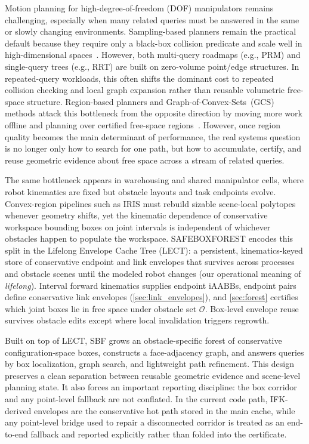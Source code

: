 \documentclass[journal]{IEEEtran}
\DeclareRobustCommand{\textsc}[1]{\textnormal{\MakeUppercase{#1}}}
\newcommand{\iAABB}{\ensuremath{\mathrm{iAABB}}}
\begin{document}
Motion planning for high-degree-of-freedom (DOF) manipulators remains challenging,
especially when many related queries must be answered in the same or slowly
changing environments. Sampling-based planners remain the practical default
because they require only a black-box collision predicate and scale well in
high-dimensional spaces~\cite{lavalle2006planning,lavalle1998rapidly,
kavraki1996probabilistic,karaman2011sampling}. However, both multi-query
roadmaps (e.g., PRM) and single-query trees (e.g., RRT) are built on
zero-volume point/edge structures. In repeated-query workloads, this often
shifts the dominant cost to repeated collision checking and local graph
expansion rather than reusable volumetric free-space structure.
Region-based planners and
Graph-of-Convex-Sets~(GCS) methods attack this bottleneck from the opposite
direction by moving more work offline and planning over certified free-space
regions~\cite{deits2015computing,marcucci2023motion,marcucci2024shortest}.
However, once region quality becomes the main determinant of performance, the
real systems question is no longer only how to search for one path, but how to
accumulate, certify, and reuse geometric evidence about free space across a
stream of related queries.

The same bottleneck appears in warehousing and shared manipulator cells, where
robot kinematics are fixed but obstacle layouts and task endpoints evolve.
Convex-region pipelines such as IRIS must rebuild sizable scene-local polytopes
whenever geometry shifts, yet the kinematic dependence of conservative workspace
bounding boxes on joint intervals is independent of whichever obstacles happen to
populate the workspace.
\textsc{SafeBoxForest} encodes this split in the Lifelong Envelope Cache Tree
(LECT): a persistent, kinematics-keyed store of conservative endpoint and link
envelopes that survives across processes and obstacle scenes until the modeled
robot changes (our operational meaning of \emph{lifelong}).
Interval forward kinematics supplies endpoint \iAABB{}s, endpoint pairs define
conservative link envelopes (\cref{sec:link_envelopes}), and \cref{sec:forest} certifies which joint boxes lie in free space under obstacle set $\mathcal{O}$.
Box-level envelope reuse survives obstacle edits except where local invalidation triggers regrowth.

Built on top of LECT, SBF grows an obstacle-specific forest of conservative
configuration-space boxes, constructs a face-adjacency graph, and answers
queries by box localization, graph search, and lightweight path refinement.
This design preserves a clean separation between reusable geometric evidence and
scene-level planning state. It also forces an important reporting discipline:
the box corridor and any point-level fallback are not conflated. In
the current code path, IFK-derived envelopes are the conservative hot path stored
in the main cache, while any point-level bridge used to repair a disconnected
corridor is treated as an end-to-end fallback and reported explicitly rather
than folded into the certificate.
\end{document}
